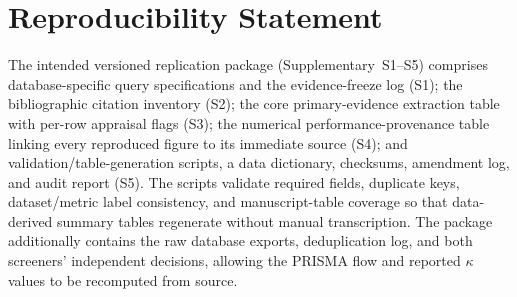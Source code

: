 \documentclass[10pt,a4paper]{article}
\newif\ifprovisionalnumbers
\begin{document}
\section{Reproducibility Statement}
\label{app:repro_statement}
The intended versioned replication package (Supplementary~S1--S5) comprises database-specific query specifications and the evidence-freeze log (S1); the bibliographic citation inventory (S2); the core primary-evidence extraction table with per-row appraisal flags (S3); the numerical performance-provenance table linking every reproduced figure to its immediate source (S4); and validation/table-generation scripts, a data dictionary, checksums, amendment log, and audit report (S5). \ifprovisionalnumbers\textbf{Author verification required: S1--S5 were not present in the manuscript files supplied for this revision, so the claims in this paragraph must be checked against the actual supplementary package before submission.}\else The scripts validate required fields, duplicate keys, dataset/metric label consistency, and manuscript-table coverage so that data-derived summary tables regenerate without manual transcription. The package additionally contains the raw database exports, deduplication log, and both screeners' independent decisions, allowing the PRISMA flow and reported $\kappa$ values to be recomputed from source.\fi



\end{document}
